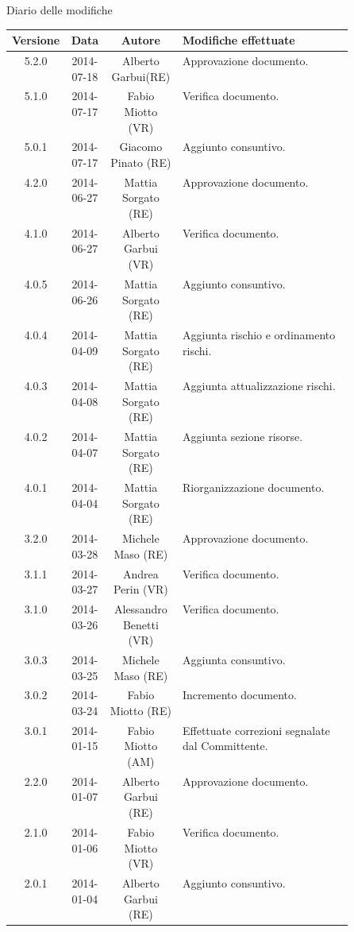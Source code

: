 
\newpage
Diario delle modifiche
\begin{center}
\begin{longtable}{|c|c|c|p{0.5\linewidth}|}
\toprule
\textbf{Versione} & \textbf{Data} & \textbf{Autore} & \textbf{Modifiche effettuate}\\

\midrule
5.2.0 & 2014-07-18 & Alberto Garbui(RE) & Approvazione documento.\\
\midrule
5.1.0 & 2014-07-17 & Fabio Miotto (VR) & Verifica documento.\\
\midrule
5.0.1 & 2014-07-17 & Giacomo Pinato (RE) & Aggiunto consuntivo.\\

\midrule
4.2.0 & 2014-06-27 & Mattia Sorgato (RE) & Approvazione documento.\\
\midrule
4.1.0 & 2014-06-27 & Alberto Garbui (VR) & Verifica documento.\\
\midrule
4.0.5 & 2014-06-26 & Mattia Sorgato (RE) & Aggiunto consuntivo.\\
\midrule
4.0.4 & 2014-04-09 & Mattia Sorgato (RE) & Aggiunta rischio e ordinamento rischi.\\
\midrule
4.0.3 & 2014-04-08 & Mattia Sorgato (RE) & Aggiunta attualizzazione rischi.\\
\midrule
4.0.2 & 2014-04-07 & Mattia Sorgato (RE) & Aggiunta sezione risorse.\\
\midrule
4.0.1 & 2014-04-04 & Mattia Sorgato (RE) & Riorganizzazione documento.\\

\midrule
3.2.0 & 2014-03-28 & Michele Maso (RE) & Approvazione documento.\\
\midrule
3.1.1 & 2014-03-27 & Andrea Perin (VR) & Verifica documento.\\
\midrule
3.1.0 & 2014-03-26 & Alessandro Benetti (VR) & Verifica documento.\\
\midrule
3.0.3 & 2014-03-25 & Michele Maso (RE) & Aggiunta consuntivo.\\
\midrule
3.0.2 & 2014-03-24 & Fabio Miotto (RE) & Incremento documento.\\
\midrule
3.0.1 & 2014-01-15 & Fabio Miotto (AM) & Effettuate correzioni segnalate dal Committente.\\

\midrule
2.2.0 & 2014-01-07 & Alberto Garbui (RE) & Approvazione documento.\\
\midrule
2.1.0 & 2014-01-06 & Fabio Miotto (VR) & Verifica documento.\\
\midrule
2.0.1 & 2014-01-04 & Alberto Garbui (RE) & Aggiunto consuntivo.\\


\end{longtable}
\end{center}
